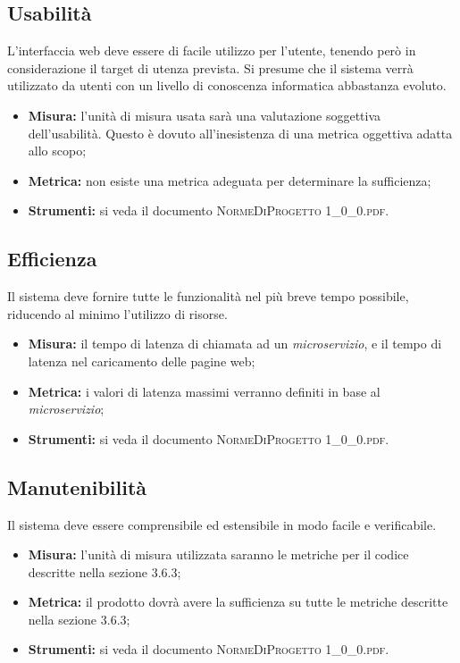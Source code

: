 	\subsection{Usabilità}
		L’interfaccia web deve essere di facile utilizzo per l’utente, tenendo però in considerazione il target di utenza prevista. Si presume che il sistema verrà utilizzato da utenti con un livello di conoscenza informatica abbastanza evoluto. 
		
		\begin{itemize}
			\item \textbf{Misura: }l’unità di misura usata sarà una valutazione soggettiva dell’usabilità. Questo
			è dovuto all’inesistenza di una metrica oggettiva adatta allo scopo;
			\item \textbf{Metrica: }non esiste una metrica adeguata per determinare la sufficienza;
			\item \textbf{Strumenti: }si veda il documento \textsc{NormeDiProgetto 1\_0\_0.pdf}.
			
		\end{itemize}
	
	\subsection{Efficienza}
		Il sistema deve fornire tutte le funzionalità nel più breve tempo possibile, riducendo al minimo l’utilizzo di risorse.
		
		\begin{itemize}
			\item \textbf{Misura: }il tempo di latenza di chiamata ad un \textit{microservizio}, e il tempo di latenza nel caricamento delle pagine web;
			\item \textbf{Metrica: }i valori di latenza massimi verranno definiti in base al \textit{microservizio};
			\item \textbf{Strumenti: }si veda il documento \textsc{NormeDiProgetto 1\_0\_0.pdf}.
			
		\end{itemize}
	
	\subsection{Manutenibilità}
		Il sistema deve essere comprensibile ed estensibile in modo facile e verificabile.
		
		\begin{itemize}
			\item \textbf{Misura: }l’unità di misura utilizzata saranno le metriche per il codice descritte nella sezione 3.6.3;
			\item \textbf{Metrica: }il prodotto dovrà avere la sufficienza su tutte le metriche descritte nella sezione 3.6.3;
			\item \textbf{Strumenti: }si veda il documento \textsc{NormeDiProgetto 1\_0\_0.pdf}.
			
		\end{itemize}
	
